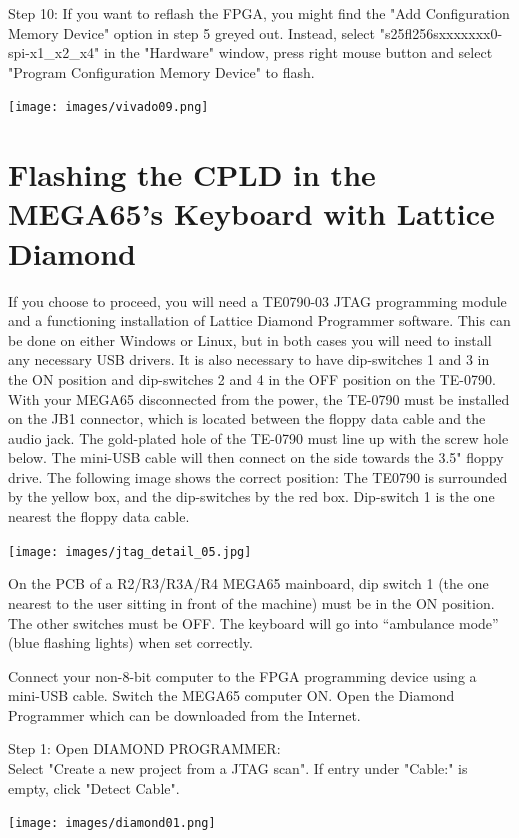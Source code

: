 \vspace{5mm}

\begin{minipage}{\linewidth}
Step 10: If you want to reflash the FPGA, you might find the
"Add Configuration Memory Device" option in step 5 greyed out.
Instead, select "s25fl256sxxxxxxx0-spi-x1\_x2\_x4"  in the "Hardware"
window, press right mouse button and select "Program Configuration
Memory Device" to flash.
  \\
  \begin{center}
    \texttt{[image: images/vivado09.png]}
  \end{center}
\end{minipage}


\section{Flashing the CPLD in the MEGA65's Keyboard with Lattice Diamond}


If you choose to proceed, you will need a TE0790-03 JTAG programming
module and a functioning installation of Lattice Diamond Programmer software.
This can be done on either Windows or Linux, but in both cases you will
need to install any necessary USB drivers. It is also necessary to have
dip-switches 1 and 3 in the ON position and dip-switches 2 and 4 in the
OFF position on the TE-0790. With your MEGA65 disconnected from the power,
the TE-0790 must be installed on the JB1 connector, which is located
between the floppy data cable and the audio jack.
The gold-plated hole of the TE-0790 must line up with the screw hole below.
The mini-USB cable will then connect on the side towards the 3.5" floppy drive.
The following image shows the correct position: The TE0790 is surrounded
by the yellow box, and the dip-switches by the red box. Dip-switch 1 is
the one nearest the floppy data cable.


\texttt{[image: images/jtag\_detail\_05.jpg]}


On the PCB of a R2/R3/R3A/R4 MEGA65 mainboard, dip switch 1 (the one nearest to the user
sitting in front of the machine) must be in the ON position. The other
switches must be OFF. The keyboard will go into ``ambulance mode''
(blue flashing lights) when set correctly.

Connect your non-8-bit computer to the FPGA programming device using a
mini-USB cable. Switch the MEGA65 computer ON. Open the Diamond Programmer
which can be downloaded from the Internet.

\begin{minipage}{\linewidth}
Step 1: Open DIAMOND PROGRAMMER: \\
Select "Create a new project from a JTAG scan". If entry
under "Cable:" is empty, click "Detect Cable".
\\
  \begin{center}
  \texttt{[image: images/diamond01.png]}
  \end{center}
\end{minipage}

